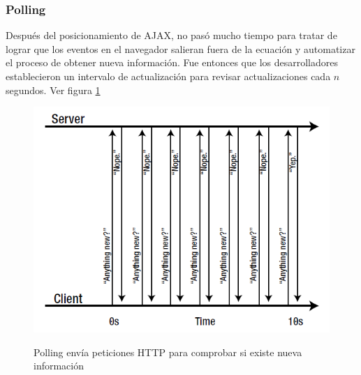 \subsubsection{Polling}
Después del posicionamiento de AJAX, no pasó mucho tiempo para tratar de lograr que los eventos en el navegador salieran fuera de la ecuación y automatizar el proceso de obtener nueva información. Fue entonces que los desarrolladores establecieron un intervalo de actualización para revisar actualizaciones cada $n$ segundos. Ver figura \ref{fig:polling}
\begin{figure}[h]
  \centering
  \includegraphics[scale=0.8]{figuras/polling.png}\\
  \caption{Polling envía peticiones HTTP para comprobar si existe nueva información}\label{fig:polling}
\end{figure}


